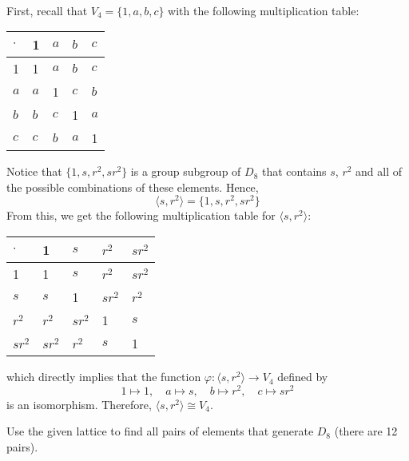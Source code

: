 \begin{solution}
    \\ First, recall that $V_4 = \{1, a, b, c\}$ with the following multiplication table:

    \begin{table}[h!]
    \centering
    \begin{tabular}{l|l l l l}
    $\cdot$ & 1   & $a$ & $b$ & $c$ \\ \hline
    1       & 1   & $a$ & $b$ & $c$ \\ 
    $a$     & $a$ & 1   & $c$ & $b$ \\ 
    $b$     & $b$ & $c$ & 1   & $a$ \\ 
    $c$     & $c$ & $b$ & $a$ & 1  
    \end{tabular}
    \end{table}
    
    Notice that $\{1, s, r^2, sr^2\}$ is a group subgroup of $D_8$ that contains $s$, $r^2$ and all of the possible combinations of these elements. Hence,
    $$\langle s, r^2\rangle = \{1, s, r^2, sr^2\}$$
    From this, we get the following multiplication table for $\langle s, r^2\rangle$:

    \begin{table}[h!]
    \centering
    \begin{tabular}{l|l l l l}
    $\cdot$ & 1      & $s$    & $r^2$  & $sr^2$ \\ \hline
    1       & 1      & $s$    & $r^2$  & $sr^2$ \\ 
    $s$     & $s$    & 1      & $sr^2$ & $r^2$  \\ 
    $r^2$   & $r^2$  & $sr^2$ & 1      & $s$    \\ 
    $sr^2$  & $sr^2$ & $r^2$  & $s$    & 1  
    \end{tabular}
    \end{table}

    \break \noindent which directly implies that the function $\varphi : \langle s, r^2\rangle \to V_4$ defined by
    $$1 \mapsto 1, \quad a \mapsto s, \quad b \mapsto r^2, \quad c \mapsto sr^2$$
    is an isomorphism. Therefore, $\langle s, r^2\rangle \cong V_4$. \\
\end{solution}

\begin{exercise}
    Use the given lattice to find all pairs of elements that generate $D_8$ (there are 12 pairs). \\
\end{exercise}

